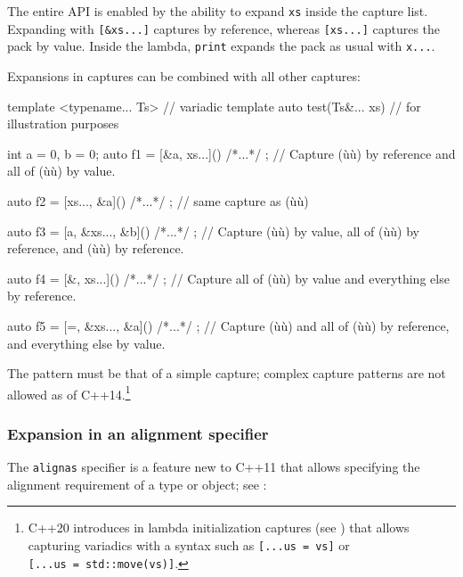 \noindent The entire API is enabled by the ability to expand \lstinline!xs! inside
the capture list. Expanding with \lstinline![&xs...]! captures by
reference, whereas \lstinline![xs...]! captures the pack by value. Inside
the lambda, \lstinline!print! expands the pack as usual with \lstinline!x...!.

Expansions in captures can be combined with all other captures:

\begin{emcppslisting}[emcppsbatch=e30]
template <typename... Ts>    // variadic template
auto test(Ts&... xs)         // for illustration purposes
{
    int a = 0, b = 0;
    auto f1 = [&a, xs...]() { /*...*/ };
        // Capture (ù{}ù) by reference and all of (ù{}ù) by value.

    auto f2 = [xs..., &a]() { /*...*/ };
        // same capture as (ù{}ù)

    auto f3 = [a, &xs..., &b]() { /*...*/ };
        // Capture (ù{}ù) by value, all of (ù{}ù) by reference, and (ù{}ù) by reference.

    auto f4 = [&, xs...]() { /*...*/ };
        // Capture all of (ù{}ù) by value and everything else by reference.

    auto f5 = [=, &xs..., &a]() { /*...*/ };
        // Capture (ù{}ù) and all of (ù{}ù) by reference, and everything else by value.
}
\end{emcppslisting}
    

\noindent The pattern must be that of a simple capture; complex capture patterns
are not allowed as of C++14.{\cprotect\footnote{C++20 introduces
 in lambda initialization captures (see \cite{revzin18}) that allows capturing variadics with a syntax such as
\lstinline![...us!~\lstinline!=!~\lstinline!vs]! or
  \lstinline![...us!~\lstinline!=!~\lstinline!std::move(vs)]!.}}

\subsubsection[Expansion in an alignment specifier]{Expansion in an alignment specifier}\label{expansion-in-an-alignment-specifier}

The \lstinline!alignas! specifier is a feature new to C++11 that allows
specifying the alignment requirement of a type or object; see
:

